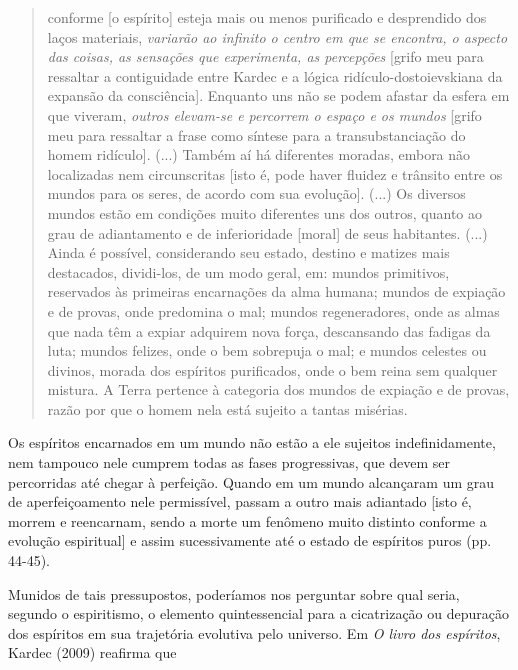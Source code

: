 \begin{quote}
conforme {[}o espírito{]} esteja mais ou menos purificado e desprendido
dos laços materiais, \emph{variarão ao infinito o centro em que se
encontra, o aspecto das coisas, as sensações que experimenta, as
percepções} {[}grifo meu para ressaltar a contiguidade entre Kardec e a
lógica ridículo-dostoievskiana da expansão da consciência{]}. Enquanto
uns não se podem afastar da esfera em que viveram, \emph{outros
elevam-se e percorrem o espaço e os mundos} {[}grifo meu para ressaltar
a frase como síntese para a transubstanciação do homem ridículo{]}.
(...) Também aí há diferentes moradas, embora não localizadas nem
circunscritas {[}isto é, pode haver fluidez e trânsito entre os mundos
para os seres, de acordo com sua evolução{]}. (...) Os diversos mundos
estão em condições muito diferentes uns dos outros, quanto ao grau de
adiantamento e de inferioridade {[}moral{]} de seus habitantes. (...)
Ainda é possível, considerando seu estado, destino e matizes mais
destacados, dividi-los, de um modo geral, em: mundos primitivos,
reservados às primeiras encarnações da alma humana; mundos de expiação e
de provas, onde predomina o mal; mundos regeneradores, onde as almas que
nada têm a expiar adquirem nova força, descansando das fadigas da luta;
mundos felizes, onde o bem sobrepuja o mal; e mundos celestes ou
divinos, morada dos espíritos purificados, onde o bem reina sem qualquer
mistura. A Terra pertence à categoria dos mundos de expiação e de
provas, razão por que o homem nela está sujeito a tantas misérias.
\end{quote}

Os espíritos encarnados em um mundo não estão a ele sujeitos
indefinidamente, nem tampouco nele cumprem todas as fases progressivas,
que devem ser percorridas até chegar à perfeição. Quando em um mundo
alcançaram um grau de aperfeiçoamento nele permissível, passam a outro
mais adiantado {[}isto é, morrem e reencarnam, sendo a morte um fenômeno
muito distinto conforme a evolução espiritual{]} e assim sucessivamente
até o estado de espíritos puros (pp. 44-45).

Munidos de tais pressupostos, poderíamos nos perguntar sobre qual seria,
segundo o espiritismo, o elemento quintessencial para a cicatrização ou
depuração dos espíritos em sua trajetória evolutiva pelo universo. Em
\emph{O livro dos espíritos}, Kardec (2009) reafirma que

